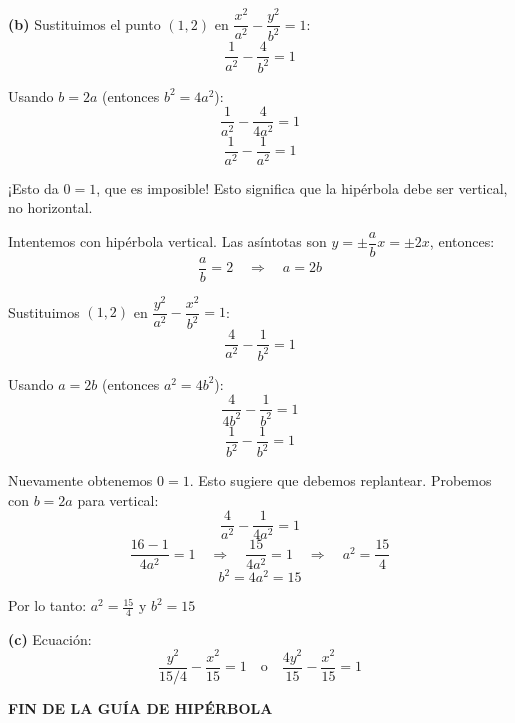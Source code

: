 \documentclass[12pt,a4paper]{article}
\begin{document}
	\textbf{(b)} Sustituimos el punto $(1,2)$ en $\dfrac{x^2}{a^2}-\dfrac{y^2}{b^2}=1$:
	\[
	\frac{1}{a^2}-\frac{4}{b^2}=1
	\]

	Usando $b=2a$ (entonces $b^2=4a^2$):
	\[
	\frac{1}{a^2}-\frac{4}{4a^2}=1
	\]
	\[
	\frac{1}{a^2}-\frac{1}{a^2}=1
	\]

	¡Esto da $0=1$, que es imposible! Esto significa que la hipérbola debe ser vertical, no horizontal.

	\bigskip

	Intentemos con hipérbola vertical. Las asíntotas son $y=\pm\dfrac{a}{b}x=\pm 2x$, entonces:
	\[
	\frac{a}{b}=2 \quad\Rightarrow\quad a=2b
	\]

	Sustituimos $(1,2)$ en $\dfrac{y^2}{a^2}-\dfrac{x^2}{b^2}=1$:
	\[
	\frac{4}{a^2}-\frac{1}{b^2}=1
	\]

	Usando $a=2b$ (entonces $a^2=4b^2$):
	\[
	\frac{4}{4b^2}-\frac{1}{b^2}=1
	\]
	\[
	\frac{1}{b^2}-\frac{1}{b^2}=1
	\]

	Nuevamente obtenemos $0=1$. Esto sugiere que debemos replantear. Probemos con $b=2a$ para vertical:
	\[
	\frac{4}{a^2}-\frac{1}{4a^2}=1
	\]
	\[
	\frac{16-1}{4a^2}=1 \quad\Rightarrow\quad \frac{15}{4a^2}=1 \quad\Rightarrow\quad a^2=\frac{15}{4}
	\]
	\[
	b^2=4a^2=15
	\]

	Por lo tanto: $\boxed{a^2=\frac{15}{4}\text{ y }b^2=15}$

	\textbf{(c)} Ecuación:
	\[
	\boxed{\frac{y^2}{15/4}-\frac{x^2}{15}=1}\quad\text{o}\quad\boxed{\frac{4y^2}{15}-\frac{x^2}{15}=1}
	\]

	\bigskip
	\bigskip

	\begin{center}
		\textbf{FIN DE LA GUÍA DE HIPÉRBOLA}
	\end{center}
\end{document}

